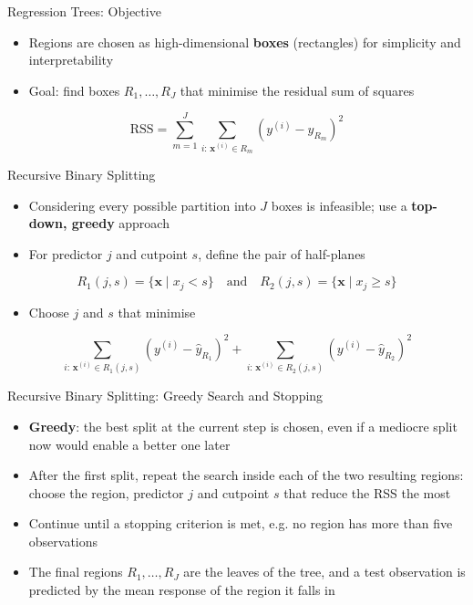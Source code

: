 \begin{frame}{Regression Trees: Objective}
    \begin{itemize}
        \item Regions are chosen as high-dimensional \textbf{boxes} (rectangles) for simplicity and interpretability
        \item Goal: find boxes $R_1, \dots, R_J$ that minimise the residual sum of squares
    \end{itemize}
    \[
        \mathrm{RSS} = \sum_{m=1}^{J} \sum_{i:\, \mathbf{x}^{(i)} \in R_m} \left( y^{(i)} - \hat{y}_{R_m} \right)^2
    \]
\end{frame}


\begin{frame}{Recursive Binary Splitting}
    \begin{itemize}
        \item Considering every possible partition into $J$ boxes is infeasible; use a \textbf{top-down, greedy} approach
        \item For predictor $j$ and cutpoint $s$, define the pair of half-planes
    \end{itemize}
    \[
        R_1(j, s) = \{ \mathbf{x} \mid x_j < s \} \quad \text{and} \quad R_2(j, s) = \{ \mathbf{x} \mid x_j \ge s \}
    \]
    \begin{itemize}
        \item Choose $j$ and $s$ that minimise
    \end{itemize}
    \[
        \sum_{i:\, \mathbf{x}^{(i)} \in R_1(j,s)} \left( y^{(i)} - \hat{y}_{R_1} \right)^2 + \sum_{i:\, \mathbf{x}^{(i)} \in R_2(j,s)} \left( y^{(i)} - \hat{y}_{R_2} \right)^2
    \]
\end{frame}


\begin{frame}{Recursive Binary Splitting: Greedy Search and Stopping}
    \begin{itemize}
        \item \textbf{Greedy}: the best split at the current step is chosen, even if a mediocre split now would enable a better one later
        \item After the first split, repeat the search inside each of the two resulting regions: choose the region, predictor $j$ and cutpoint $s$ that reduce the RSS the most
        \item Continue until a stopping criterion is met, e.g. no region has more than five observations
        \item The final regions $R_1, \dots, R_J$ are the leaves of the tree, and a test observation is predicted by the mean response of the region it falls in
    \end{itemize}
\end{frame}


